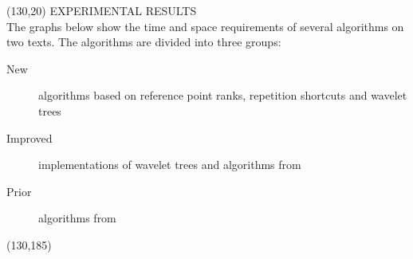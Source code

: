 \documentclass[a4paper]{article} %
\begin{document}
\begin{textblock}{60}(130,20)
  {\sffamily\normalsize{\color{sciorange}
      EXPERIMENTAL RESULTS}}\vspace{1mm}\\
  \footnotesize 
  The graphs below show the time and space requirements of several
  algorithms on two texts.  The algorithms are divided
  into three groups:
  \begin{description}
  \item[\color{new}New] algorithms based on reference point ranks, repetition
    shortcuts and wavelet trees
  \item[\color{improved}Improved] implementations of wavelet trees and
    algorithms from~\cite{ll2005}
  \item[\color{prior}Prior] algorithms from~\cite{s2001,ll2005}
  \end{description}
  \vspace{2mm}

  \vspace{2mm}

\end{textblock}


\begin{textblock}{60}(130,185)
  \def\refname{\normalfont\sffamily\normalsize{\color{sciorange}REFERENCES}}
  \scriptsize\sffamily
  
  
\end{textblock}

\end{document}
